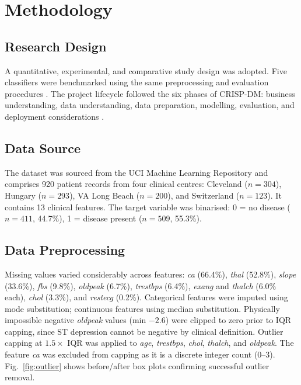 \documentclass[conference]{IEEEtran}
\begin{document}
\section{Methodology}

\subsection{Research Design}
A quantitative, experimental, and comparative study design was adopted. Five classifiers were benchmarked using the same preprocessing and evaluation procedures \cite{sutanto2024}. The project lifecycle followed the six phases of CRISP-DM: business understanding, data understanding, data preparation, modelling, evaluation, and deployment considerations \cite{desai2022}.

\subsection{Data Source}
The dataset was sourced from the UCI Machine Learning Repository and comprises 920 patient records from four clinical centres: Cleveland ($n{=}304$), Hungary ($n{=}293$), VA Long Beach ($n{=}200$), and Switzerland ($n{=}123$). It contains 13 clinical features. The target variable was binarised: 0 = no disease ($n{=}411$, 44.7\%), 1 = disease present ($n{=}509$, 55.3\%).

\subsection{Data Preprocessing}
Missing values varied considerably across features: \textit{ca} (66.4\%), \textit{thal} (52.8\%), \textit{slope} (33.6\%), \textit{fbs} (9.8\%), \textit{oldpeak} (6.7\%), \textit{trestbps} (6.4\%), \textit{exang} and \textit{thalch} (6.0\% each), \textit{chol} (3.3\%), and \textit{restecg} (0.2\%). Categorical features were imputed using mode substitution; continuous features using median substitution. Physically impossible negative \textit{oldpeak} values (min $-2.6$) were clipped to zero prior to IQR capping, since ST depression cannot be negative by clinical definition. Outlier capping at $1.5 \times$ IQR was applied to \textit{age}, \textit{trestbps}, \textit{chol}, \textit{thalch}, and \textit{oldpeak}. The feature \textit{ca} was excluded from capping as it is a discrete integer count (0--3). Fig.~\ref{fig:outlier} shows before/after box plots confirming successful outlier removal.
\end{document}
